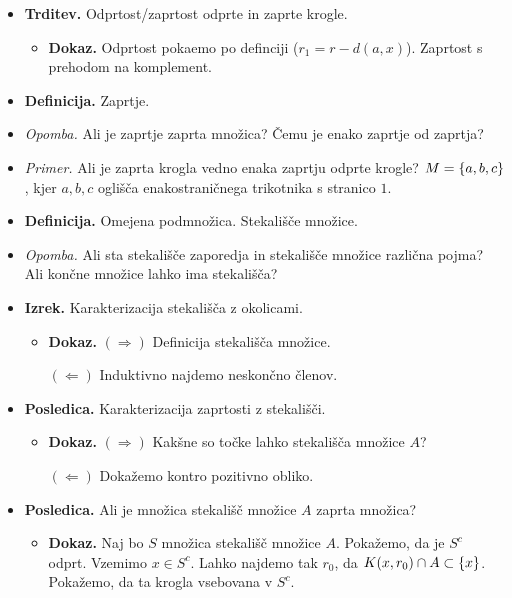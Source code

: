 \begin{enumerate}
\begin{itemize}
        \item \colorbox{blue!30}{\textbf{Trditev.}} Odprtost/zaprtost odprte in zaprte krogle.
        \begin{itemize}
            \item \colorbox{green!30}{\textbf{Dokaz.}} Odprtost pokaemo po definciji ($r_1 = r - d(a, x)$). Zaprtost s prehodom na komplement.
        \end{itemize} 
        \item \colorbox{purple!30}{\textbf{Definicija.}} Zaprtje.
        \item \colorbox{yellow!30}{\emph{Opomba.}} Ali je zaprtje zaprta množica? Čemu je enako zaprtje od zaprtja?
        \item \colorbox{yellow!30}{\emph{Primer.}} Ali je zaprta krogla vedno enaka zaprtju odprte krogle? $M = \left\{a, b, c\right\}$, kjer $a ,b, c$ oglišča enakostraničnega trikotnika s stranico $1$.
        \item \colorbox{purple!30}{\textbf{Definicija.}} Omejena podmnožica. Stekališče množice.
        \item \colorbox{yellow!30}{\emph{Opomba.}} Ali sta stekališče zaporedja in stekališče množice različna pojma? Ali končne množice lahko ima stekališča?
        \item \colorbox{blue!30}{\textbf{Izrek.}} Karakterizacija stekališča z okolicami.
        \begin{itemize}
            \item \colorbox{green!30}{\textbf{Dokaz.}} $(\Rightarrow)$ Definicija stekališča množice.
            
            $(\Leftarrow)$ Induktivno najdemo neskončno členov.
        \end{itemize}
        \item \colorbox{orange!30}{\textbf{Posledica.}} Karakterizacija zaprtosti z stekališči.
        \begin{itemize}
            \item \colorbox{green!30}{\textbf{Dokaz.}} $(\Rightarrow)$ Kakšne so točke lahko stekališča množice $A$?
            
            $(\Leftarrow)$ Dokažemo kontro pozitivno obliko.
        \end{itemize}
        \item \colorbox{orange!30}{\textbf{Posledica.}} Ali je množica stekališč množice $A$ zaprta množica?
        \begin{itemize}
            \item \colorbox{green!30}{\textbf{Dokaz.}} Naj bo $S$ množica stekališč množice $A$. Pokažemo, da je $S^c$ odprt. Vzemimo $x \in S^c$. Lahko najdemo tak $r_0$, da $K(x, r_0) \cap A \subset \left\{x\right\}$. Pokažemo, da ta krogla vsebovana v $S^c$.
        \end{itemize}
    \end{itemize}


\end{enumerate}
